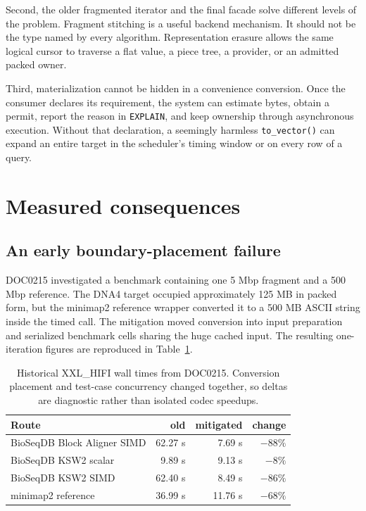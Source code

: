 Second, the older fragmented iterator and the final facade solve different
levels of the problem.  Fragment stitching is a useful backend mechanism.  It
should not be the type named by every algorithm.  Representation erasure
allows the same logical cursor to traverse a flat value, a piece tree, a
provider, or an admitted packed owner.

Third, materialization cannot be hidden in a convenience conversion.  Once the
consumer declares its requirement, the system can estimate bytes, obtain a
permit, report the reason in \texttt{EXPLAIN}, and keep ownership through
asynchronous execution.  Without that declaration, a seemingly harmless
\texttt{to\_vector()} can expand an entire target in the scheduler's timing
window or on every row of a query.

\section{Measured consequences}
\label{sec:sequence-abstraction-results}

\subsection{An early boundary-placement failure}

DOC0215 investigated a benchmark containing one 5 Mbp fragment and a 500 Mbp
reference.  The DNA4 target occupied approximately 125 MB in packed form, but
the minimap2 reference wrapper converted it to a 500 MB ASCII string inside
the timed call.  The mitigation moved conversion into input preparation and
serialized benchmark cells sharing the huge cached input.  The resulting
one-iteration figures are reproduced in
Table~\ref{tab:xxl-boundary-history}.

\begin{table}[ht]
\centering
\caption{Historical XXL\_HIFI wall times from DOC0215.  Conversion placement
and test-case concurrency changed together, so deltas are diagnostic rather
than isolated codec speedups.}
\label{tab:xxl-boundary-history}
\begin{tabular}{lrrr}
\textbf{Route} & \textbf{old} & \textbf{mitigated} & \textbf{change}\\
\hline
\mbox{BioSeqDB} Block Aligner SIMD & 62.27 s & 7.69 s & \(-88\%\)\\
\mbox{BioSeqDB} KSW2 scalar & 9.89 s & 9.13 s & \(-8\%\)\\
\mbox{BioSeqDB} KSW2 SIMD & 62.40 s & 8.49 s & \(-86\%\)\\
minimap2 reference & 36.99 s & 11.76 s & \(-68\%\)\\
\end{tabular}
\end{table}

